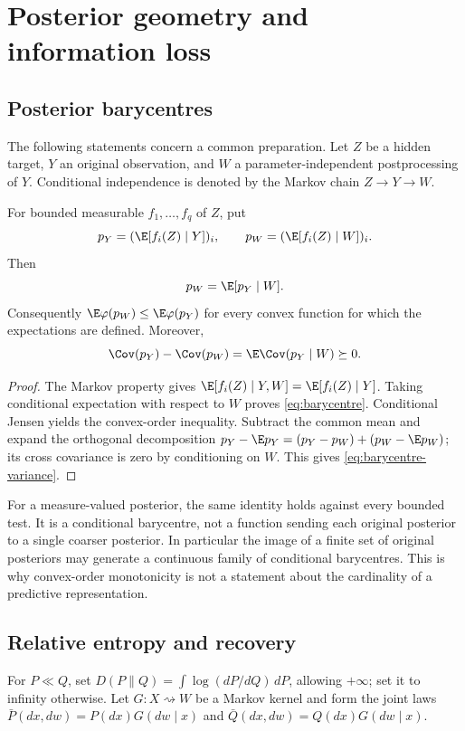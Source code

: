 \section{Posterior geometry and information loss}\label{sec:information}
\subsection{Posterior barycentres}
The following statements concern a common preparation. Let $Z$ be a hidden
target, $Y$ an original observation, and $W$ a parameter-independent
postprocessing of $Y$. Conditional independence is denoted by the Markov
chain $Z\to Y\to W$.

\begin{theorem}\label{thm:barycentre}
For bounded measurable $f_1,\ldots,f_q$ of $Z$, put
\[
 p_Y=(\E[f_i(Z)\mid Y])_i,
 \qquad p_W=(\E[f_i(Z)\mid W])_i.
\]
Then
\begin{equation}\label{eq:barycentre}
 p_W=\E[p_Y\mid W].
\end{equation}
Consequently $\E\varphi(p_W)\le\E\varphi(p_Y)$ for every convex function
for which the expectations are defined. Moreover,
\begin{equation}\label{eq:barycentre-variance}
 \Cov(p_Y)-\Cov(p_W)=\E\Cov(p_Y\mid W)\succeq0.
\end{equation}
\end{theorem}
\begin{proof}
The Markov property gives
$\E[f_i(Z)\mid Y,W]=\E[f_i(Z)\mid Y]$. Taking conditional expectation
with respect to $W$ proves \eqref{eq:barycentre}. Conditional Jensen yields
the convex-order inequality. Subtract the common mean and expand the
orthogonal decomposition
$p_Y-\E p_Y=(p_Y-p_W)+(p_W-\E p_W)$; its cross covariance is zero by
conditioning on $W$. This gives \eqref{eq:barycentre-variance}.
\end{proof}

For a measure-valued posterior, the same identity holds against every
bounded test. It is a conditional barycentre, not a function sending each
original posterior to a single coarser posterior. In particular the image
of a finite set of original posteriors may generate a continuous family of
conditional barycentres. This is why convex-order monotonicity is not a
statement about the cardinality of a predictive representation.

\subsection{Relative entropy and recovery}
For $P\ll Q$, set
$D(P\|Q)=\int\log(dP/dQ)\,dP$, allowing $+\infty$; set it to infinity
otherwise. Let $G:X\rightsquigarrow W$ be a Markov kernel and form the
joint laws $\bar P(dx,dw)=P(dx)G(dw\mid x)$ and
$\bar Q(dx,dw)=Q(dx)G(dw\mid x)$.

